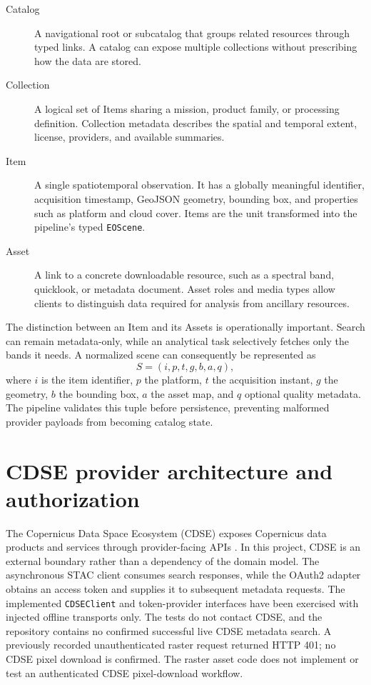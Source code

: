 \begin{description}
\item[Catalog] A navigational root or subcatalog that groups related resources through typed
links. A catalog can expose multiple collections without prescribing how the data are stored.
\item[Collection] A logical set of Items sharing a mission, product family, or processing
definition. Collection metadata describes the spatial and temporal extent, license, providers, and
available summaries.
\item[Item] A single spatiotemporal observation. It has a globally meaningful identifier,
acquisition timestamp, GeoJSON geometry, bounding box, and properties such as platform and cloud
cover. Items are the unit transformed into the pipeline's typed \texttt{EOScene}.
\item[Asset] A link to a concrete downloadable resource, such as a spectral band, quicklook, or
metadata document. Asset roles and media types allow clients to distinguish data required for
analysis from ancillary resources.
\end{description}

The distinction between an Item and its Assets is operationally important. Search can remain
metadata-only, while an analytical task selectively fetches only the bands it needs. A normalized
scene can consequently be represented as
\[
 S = (i, p, t, g, b, a, q),
\]
where \(i\) is the item identifier, \(p\) the platform, \(t\) the acquisition instant, \(g\) the
geometry, \(b\) the bounding box, \(a\) the asset map, and \(q\) optional quality metadata. The
pipeline validates this tuple before persistence, preventing malformed provider payloads from
becoming catalog state.

\section{CDSE provider architecture and authorization}

The Copernicus Data Space Ecosystem (CDSE) exposes Copernicus data products and services through
provider-facing APIs \cite{cdse}. In this project, CDSE is an external boundary rather than a
dependency of the domain model. The asynchronous STAC client consumes search responses, while the
OAuth2 adapter obtains an access token and supplies it to subsequent metadata requests.
The implemented \texttt{CDSEClient} and token-provider interfaces have been exercised with
injected offline transports only. The tests do not contact CDSE, and the repository contains no
confirmed successful live CDSE metadata search. A previously recorded unauthenticated raster
request returned HTTP 401; no CDSE pixel download is confirmed. The raster asset code does not
implement or test an authenticated CDSE pixel-download workflow.

